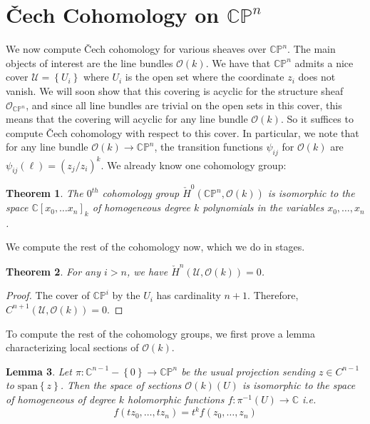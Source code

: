 \documentclass[psamsfonts, 12pt]{amsart}
\newtheorem{thm}{Theorem}[section]
\newtheorem{lem}[thm]{Lemma}
\theoremstyle{definition}
\theoremstyle{remark}
\renewcommand{\O}{\mathcal{O}}
\newcommand{\C}{\mathbb{C}}
\newcommand{\CP}{\mathbb{CP}}
\newcommand{\inv}{^{-1}}
\newcommand{\set}[1]{\left\lbrace #1 \right\rbrace}
\begin{document}
\section{\v{C}ech Cohomology on $\CP^n$}
%
We now compute \v{C}ech cohomology for various sheaves over $\CP^n$. The main objects
of interest are the line bundles $\O(k)$. We have that $\CP^n$ admits a nice cover
$\mathcal{U} = \set{U_i}$ where $U_i$ is the open set where the coordinate $z_i$ does not
vanish. We will soon show that this covering is acyclic for the structure sheaf
$\O_{\CP^n}$, and since all line bundles are trivial on the open sets in this cover, this
means that the covering will acyclic for any line bundle $\O(k)$. So it suffices to
compute \v{C}ech cohomology with respect to this cover. In particular, we note that for
any line bundle $\O(k) \to \CP^n$, the transition functions $\psi_{ij}$ for $\O(k)$
are $\psi_{ij}(\ell) = (z_j/z_i)^k$. We already know one cohomology group:
%
\begin{thm}
The $0^{th}$ cohomology group $\check{H}^0(\CP^n, \O(k))$ is isomorphic to the space
$\C[x_0, \ldots x_n]_k$ of homogeneous degree $k$ polynomials in the variables
$x_0, \ldots , x_n$.
\end{thm}
%
We compute the rest of the cohomology now, which we do in stages.
%
\begin{thm}
For any $i > n$, we have $\check{H}^n(\mathcal{U},\O(k)) = 0$.
\end{thm}
%
\begin{proof}
The cover of $\CP^i$ by the $U_i$ has cardinality $n+1$. Therefore,
$C^{n+1}(\mathcal{U}, \O(k)) = 0$.
\end{proof}
%
To compute the rest of the cohomology groups, we first prove a lemma characterizing
local sections of $\O(k)$.
%
\begin{lem}
Let $\pi : \C^{n-1} - \set{0} \to \CP^n$ be the usual projection sending
$z \in C^{n-1}$ to $\mathrm{span}\set{z}$. Then the space of sections
$\O(k)(U)$ is isomorphic to the space of homogeneous of degree $k$  holomorphic functions
$f : \pi\inv(U) \to \C$ i.e.
\[
f(tz_0, \ldots, tz_n) = t^kf(z_0,\ldots, z_n)
\]
\end{lem}
%
\end{document}
